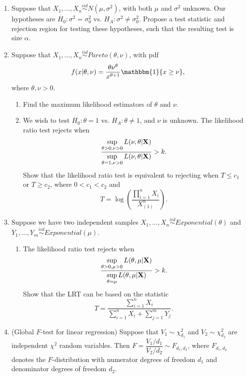 \documentclass[11pt]{article}
\begin{document}
\begin{enumerate}
\item Suppose that $X_1,...,X_n \overset{iid}{\sim} N(\mu, \sigma^2)$, with both $\mu$ and $\sigma^2$ unknown. Our hypotheses are $H_0: \sigma^2 = \sigma_0^2$ vs. $H_A: \sigma^2 \neq \sigma_0^2$. Propose a test statistic and rejection region for testing these hypotheses, such that the resulting test is size $\alpha$.

\item Suppose that $X_1,...,X_n \overset{iid}{\sim} Pareto(\theta, \nu)$, with pdf
$$f(x |\theta, \nu) = \dfrac{\theta \nu^{\theta}}{x^{\theta + 1}} \mathbbm{1}\{x \geq \nu\},$$
where $\theta, \nu > 0$. 

\begin{enumerate}
\item Find the maximum likelihood estimators of $\theta$ and $\nu$.

\item We wish to test $H_0: \theta = 1$ vs. $H_A: \theta \neq 1$, and $\nu$ is unknown. The likelihood ratio test rejects when
$$\dfrac{\sup \limits_{\theta > 0, \nu > 0} L(\nu, \theta | {\bf X})}{\sup \limits_{\theta = 1, \nu > 0} L(\nu, \theta | {\bf X})} > k.$$
Show that the likelihood ratio test is equivalent to rejecting when $T \leq c_1$ or $T \geq c_2$, where $0 < c_1 < c_2$ and
$$T = \log \left( \frac{\prod \limits_{i=1}^n X_i}{X_{(1)}^n} \right).$$
\end{enumerate}

\item Suppose we have two independent samples $X_1,...,X_n \overset{iid}{\sim} Exponential(\theta)$ and $Y_1,...,Y_m \overset{iid}{\sim} Exponential(\mu)$.

\begin{enumerate}
\item The likelihood ratio test rejects when 
$$\frac{\sup \limits_{\theta > 0, \mu > 0} L(\theta, \mu | {\bf X})}{\sup \limits_{\theta = \mu} L(\theta, \mu | {\bf X})} > k.$$
Show that the LRT can be based on the statistic
$$T = \frac{\sum \limits_{i=1}^n X_i}{\sum \limits_{i=1}^n X_i + \sum \limits_{j=1}^m Y_j}.$$
\end{enumerate}

\item (Global $F$-test for linear regression) Suppose that $V_1 \sim \chi^2_{d_1}$ and $V_2 \sim \chi^2_{d_2}$ are independent $\chi^2$ random variables. Then $F = \dfrac{V_1/d_1}{V_2/d_2} \sim F_{d_1, d_2}$, where $F_{d_1, d_2}$ denotes the $F$-distribution with numerator degrees of freedom $d_1$ and denominator degrees of freedom $d_2$.\\


\end{enumerate}
\end{document}
